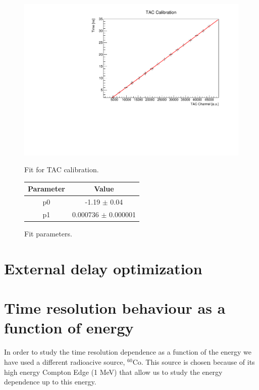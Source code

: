 \documentclass[a4paper,11pt]{article}
\begin{document}
\begin{figure}[h!]
\begin{minipage}[b]{0.6\textwidth}
\centering
\includegraphics[width=\textwidth]{fit_calibrazione_tac}
\caption{Fit for TAC calibration.}
\label{fig: fit tac}
\end{minipage}
\hfill
\begin{minipage}[b]{0.45\textwidth}
\centering
\begin{tabular}{cc}
\toprule
\toprule
Parameter & Value \\
\midrule
p0     & -1.19 $\pm$  0.04 \\
p1     &  0.000736   $\pm$  0.000001\\
\bottomrule
\bottomrule
\end{tabular}
\vspace{1.5cm}
\caption*{Fit parameters.}
\end{minipage}

\end{figure}
%

\section*{External delay optimization}

\section*{Time resolution behaviour as a function of energy}
In order to study the time resolution dependence as a function of the energy we have used a different radioacive source, $^{60}$Co. This source is chosen because of its high energy Compton Edge (1 MeV) that allow us to study the energy dependence up to this energy. 
\end{document}

